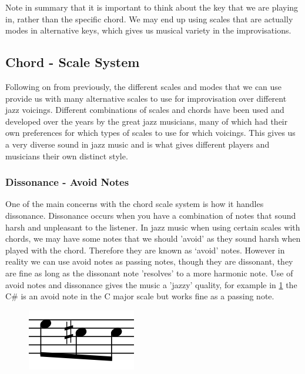 \documentclass[pdftex,12pt,a4paper]{report}
\begin{document}
Note in summary that it is important to think about the key that we are playing in, rather than the specific chord. We may end up using scales that are actually modes in alternative keys, which gives us musical variety in the improvisations.

\subsection{Chord - Scale System}
Following on from previously, the different scales and modes that we can use provide us with many alternative scales to use for improvisation over different jazz voicings. Different combinations of scales and chords have been used and developed over the years by the great jazz musicians, many of which had their own preferences for which types of scales to use for which voicings. This gives us a very diverse sound in jazz music and is what gives different players and musicians their own distinct style. 

\subsubsection{Dissonance - Avoid Notes} \label{avoidnotes}
One of the main concerns with the chord scale system is how it handles dissonance. Dissonance occurs when you have a combination of notes that sound harsh and unpleasant to the listener. In jazz music when using certain scales with chords, we may have some notes that we should 'avoid' as they sound harsh when played with the chord. Therefore they are known as `avoid' notes. However in reality we can use avoid notes as passing notes, though they are dissonant, they are fine as long as the dissonant note 'resolves' to a more harmonic note. Use of avoid notes and dissonance gives the music a 'jazzy' quality, for example in \ref{fig:avoidexample} the C\# is an avoid note in the C major scale but works fine as a passing note.

\begin{figure}[here]
  \centering
  \includegraphics[scale=0.4]{figure/approachnormal.png}
  \label{fig:avoidexample}
\end{figure}
\end{document}
